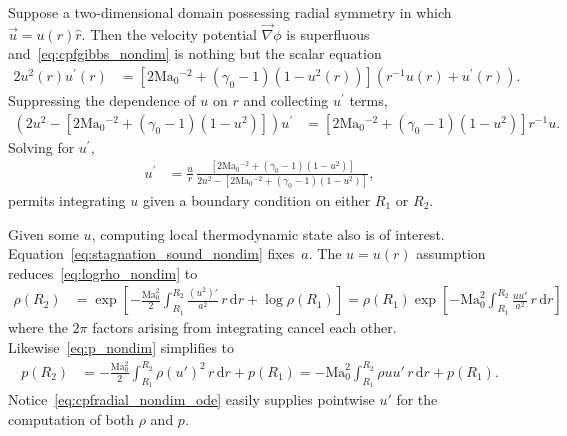 \documentclass[letterpaper,11pt,nointlimits,reqno]{amsart}
\newcommand{\Mach}[1][]{\mbox{Ma}_{#1}}
\begin{document}
Suppose a two-dimensional domain possessing radial symmetry in which
$\vec{u}={u}\!\left(r\right)\hat{r}$.  Then the velocity potential
$\vec{\nabla}\phi$ is superfluous and~\eqref{eq:cpfgibbs_nondim} is nothing but
the scalar equation
\begin{align}
       2 u^2\!\left(r\right) u^\prime\!\left(r\right)
    &=
       \left[
          2 \Mach[0]{}^{-2}
        + \left(\gamma_0-1\right) \left(1 - u^2\!\left(r\right)\right)
       \right]
       \left(
          r^{-1} u\!\left(r\right) + u^\prime\!\left(r\right)
       \right)
.
\end{align}
Suppressing the dependence of $u$ on $r$ and collecting $u^\prime$ terms,
\begin{align}
       \left(
           2 u^2
         - \left[
              2 \Mach[0]{}^{-2} + \left(\gamma_0-1\right) \left(1 - u^2\right)
           \right]
       \right)
       u^\prime
    &=
       \left[
          2 \Mach[0]{}^{-2} + \left(\gamma_0-1\right) \left(1 - u^2\right)
       \right]
       r^{-1} u
.
\end{align}
Solving for $u^\prime$,
\begin{align}
       u^\prime
    &=
       \frac{u}{r}
       \,
       \frac{
         \left[
            2 \Mach[0]{}^{-2} + \left(\gamma_0-1\right) \left(1 - u^2\right)
         \right]
       }{
           2 u^2
         - \left[
              2 \Mach[0]{}^{-2} + \left(\gamma_0-1\right) \left(1 - u^2\right)
           \right]
       }
\label{eq:cpfradial_nondim_ode}
,
\end{align}
permits integrating $u$ given a boundary condition on either $R_1$ or $R_2$.

Given some $u$, computing local thermodynamic state also is of interest.
Equation~\eqref{eq:stagnation_sound_nondim} fixes~$a$.  The
$u=u\!\left(r\right)$ assumption reduces~\eqref{eq:logrho_nondim} to
\begin{align}
  \rho\!\left(R_2\right)
  &=
  \exp\left[
    - \frac{\Mach[0]^2}{2} \int_{R_1}^{R_2}
        \frac{\left(u^2\right)'}{a^2}
      \, r \, \mathrm{d}r
    + \log\rho\!\left(R_1\right)
  \right]
   =
  \rho\!\left(R_1\right) \exp\left[
    - \Mach[0]^2 \int_{R_1}^{R_2}
        \frac{u u'}{a^2}
      \, r \, \mathrm{d}r
  \right]
\label{eq:cpfradial_nondim_rho}
\end{align}
where the $2\pi$ factors arising from integrating cancel each other.
Likewise~\eqref{eq:p_nondim} simplifies to
\begin{align}
  p\!\left(R_2\right)
  &=
    - \frac{\Mach[0]^2}{2} \int_{R_1}^{R_2}
        \rho \left(u'\right)^2
      \, r \, \mathrm{d}r
    + p\!\left(R_1\right)
   =
    -\Mach[0]^2 \int_{R_1}^{R_2} \rho u u' \, r \, \mathrm{d}r
      + p\!\left(R_1\right)
\label{eq:cpfradial_nondim_p}
.
\end{align}
Notice~\eqref{eq:cpfradial_nondim_ode} easily supplies pointwise $u'$ for the
computation of both $\rho$ and $p$.
\end{document}
